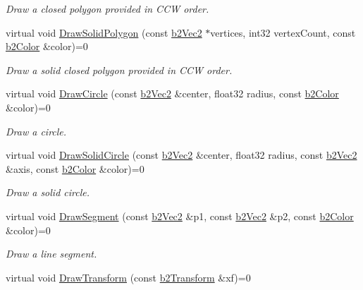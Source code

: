 \begin{DoxyCompactItemize}
\begin{DoxyCompactList}\small\item\em Draw a closed polygon provided in C\+CW order. \end{DoxyCompactList}\item 
virtual void \hyperlink{classb2_draw_a76f2d67de0781a32cab116278c5c9eea}{Draw\+Solid\+Polygon} (const \hyperlink{structb2_vec2}{b2\+Vec2} $\ast$vertices, int32 vertex\+Count, const \hyperlink{structb2_color}{b2\+Color} \&color)=0\hypertarget{classb2_draw_a76f2d67de0781a32cab116278c5c9eea}{}\label{classb2_draw_a76f2d67de0781a32cab116278c5c9eea}

\begin{DoxyCompactList}\small\item\em Draw a solid closed polygon provided in C\+CW order. \end{DoxyCompactList}\item 
virtual void \hyperlink{classb2_draw_ae2effe9bca87c8d7cb90e860d13b7e9e}{Draw\+Circle} (const \hyperlink{structb2_vec2}{b2\+Vec2} \&center, float32 radius, const \hyperlink{structb2_color}{b2\+Color} \&color)=0\hypertarget{classb2_draw_ae2effe9bca87c8d7cb90e860d13b7e9e}{}\label{classb2_draw_ae2effe9bca87c8d7cb90e860d13b7e9e}

\begin{DoxyCompactList}\small\item\em Draw a circle. \end{DoxyCompactList}\item 
virtual void \hyperlink{classb2_draw_a775a1d0472c5980d597904c7b596a0a6}{Draw\+Solid\+Circle} (const \hyperlink{structb2_vec2}{b2\+Vec2} \&center, float32 radius, const \hyperlink{structb2_vec2}{b2\+Vec2} \&axis, const \hyperlink{structb2_color}{b2\+Color} \&color)=0\hypertarget{classb2_draw_a775a1d0472c5980d597904c7b596a0a6}{}\label{classb2_draw_a775a1d0472c5980d597904c7b596a0a6}

\begin{DoxyCompactList}\small\item\em Draw a solid circle. \end{DoxyCompactList}\item 
virtual void \hyperlink{classb2_draw_a1de5aaf50db875d1c644c596832af57d}{Draw\+Segment} (const \hyperlink{structb2_vec2}{b2\+Vec2} \&p1, const \hyperlink{structb2_vec2}{b2\+Vec2} \&p2, const \hyperlink{structb2_color}{b2\+Color} \&color)=0\hypertarget{classb2_draw_a1de5aaf50db875d1c644c596832af57d}{}\label{classb2_draw_a1de5aaf50db875d1c644c596832af57d}

\begin{DoxyCompactList}\small\item\em Draw a line segment. \end{DoxyCompactList}\item 
virtual void \hyperlink{classb2_draw_ade698123482a491a7a61fa1fe4d3a4f4}{Draw\+Transform} (const \hyperlink{structb2_transform}{b2\+Transform} \&xf)=0
\end{DoxyCompactItemize}
